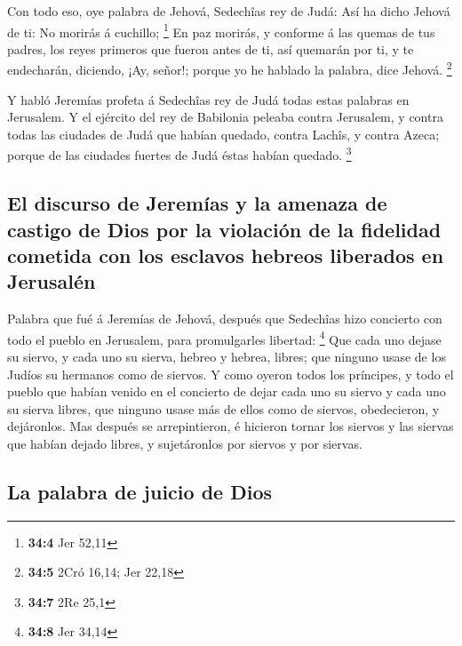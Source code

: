  Con todo eso, oye palabra de Jehová, Sedechîas rey de Judá:
Así ha dicho Jehová de ti: No morirás á cuchillo; \footnote{\textbf{34:4}
  Jer 52,11}  En paz morirás, y conforme á las quemas de tus
padres, los reyes primeros que fueron antes de ti, así quemarán por ti,
y te endecharán, diciendo, ¡Ay, señor!; porque yo he hablado la palabra,
dice Jehová. \footnote{\textbf{34:5} 2Cró 16,14; Jer 22,18}

 Y habló Jeremías profeta á Sedechîas rey de Judá todas
estas palabras en Jerusalem.  Y el ejército del rey de
Babilonia peleaba contra Jerusalem, y contra todas las ciudades de Judá
que habían quedado, contra Lachîs, y contra Azeca; porque de las
ciudades fuertes de Judá éstas habían quedado. \footnote{\textbf{34:7}
  2Re 25,1}

\hypertarget{el-discurso-de-jeremuxedas-y-la-amenaza-de-castigo-de-dios-por-la-violaciuxf3n-de-la-fidelidad-cometida-con-los-esclavos-hebreos-liberados-en-jerusaluxe9n}{%
\subsection{El discurso de Jeremías y la amenaza de castigo de Dios por
la violación de la fidelidad cometida con los esclavos hebreos liberados
en
Jerusalén}\label{el-discurso-de-jeremuxedas-y-la-amenaza-de-castigo-de-dios-por-la-violaciuxf3n-de-la-fidelidad-cometida-con-los-esclavos-hebreos-liberados-en-jerusaluxe9n}}

 Palabra que fué á Jeremías de Jehová, después que Sedechîas
hizo concierto con todo el pueblo en Jerusalem, para promulgarles
libertad: \footnote{\textbf{34:8} Jer 34,14}  Que cada uno
dejase su siervo, y cada uno su sierva, hebreo y hebrea, libres; que
ninguno usase de los Judíos su hermanos como de siervos.  Y
como oyeron todos los príncipes, y todo el pueblo que habían venido en
el concierto de dejar cada uno su siervo y cada uno su sierva libres,
que ninguno usase más de ellos como de siervos, obedecieron, y
dejáronlos.  Mas después se arrepintieron, é hicieron
tornar los siervos y las siervas que habían dejado libres, y
sujetáronlos por siervos y por siervas.

\hypertarget{la-palabra-de-juicio-de-dios}{%
\subsection{La palabra de juicio de
Dios}\label{la-palabra-de-juicio-de-dios}}

